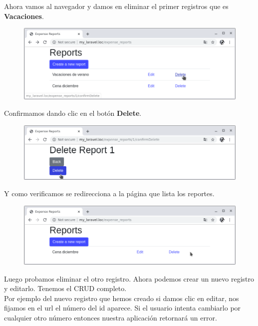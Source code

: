 \documentclass{article}
\begin{document}
Ahora vamos al navegador y damos en eliminar el primer registros que es
\textbf{Vacaciones}.

\begin{figure}[h!]
  \centering
  \includegraphics[scale=0.5]{./Pictures/080_eliminar_vacaciones.png}
\end{figure}

Confirmamos dando clic en el botón \textbf{Delete}.

\newpage

\begin{figure}[h!]
  \centering
  \includegraphics[scale=0.5]{./Pictures/081_delete_confirm.png}
\end{figure}

Y como verificamos se redirecciona a la página que lista los reportes.

\begin{figure}[h!]
  \centering
  \includegraphics[scale=0.5]{./Pictures/082_delete_ok.png}
\end{figure}

Luego probamos eliminar el otro registro. Ahora podemos crear un nuevo registro
y editarlo. Tenemos el CRUD completo.\\

Por ejemplo del nuevo registro que hemos creado si damos clic en editar, nos
fijamos en el url el número del id aparece. Si el usuario intenta cambiarlo por
cualquier otro número entonces nuestra aplicación retornará un error.
\end{document}
